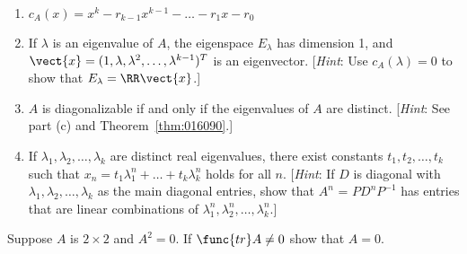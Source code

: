 \begin{multicols}{2}
\begin{ex}
\begin{enumerate}[label={\alph*.}]
\item $c_{A}(x) = x^{k} - r_{k-1}x^{k-1} - \dots - r_{1}x - r_{0}$

\item If $\lambda$ is an eigenvalue of $A$, the eigenspace $E_{\lambda}$ has dimension 1, and $\vect{x} = (1, \lambda, \lambda^{2}, \dots, \lambda^{k-1})^{T}$ is an eigenvector. [\textit{Hint}: Use $c_{A}(\lambda) = 0$ to show that $E_{\lambda} = \RR\vect{x}$.]

\item $A$ is diagonalizable if and only if the eigenvalues of $A$ are distinct. [\textit{Hint}: See part (c) and Theorem~\ref{thm:016090}.]

\item If $\lambda_{1}, \lambda_{2}, \dots, \lambda_{k}$ are distinct real eigenvalues, there exist constants $t_{1}, t_{2}, \dots, t_{k}$ such that $x_n = t_1\lambda_1^n + \dots + t_k\lambda_k^n$ holds for all $n$. [\textit{Hint}: If $D$ is diagonal with $\lambda_{1}, \lambda_{2}, \dots, \lambda_{k}$ as the main diagonal entries, show that $A^{n}$ = $PD^{n}P^{-1}$ has entries that are linear combinations of $\lambda_1^n, \lambda_2^n, \dots, \lambda_k^n$.]
\end{enumerate}
\end{ex}

\begin{ex} Suppose $A$ is $2 \times 2$ and $A^2=0$. If $\func{tr} A \neq 0$ show that $A=0$.
\end{ex}
\end{multicols}
